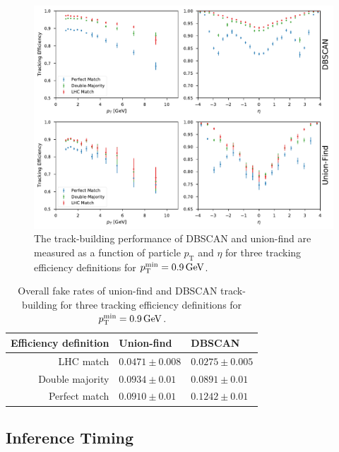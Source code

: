 \documentclass[twocolumn]{svjour3}
\newcommand{\pt}{\ensuremath{p_{\mathrm{T}}}\xspace}
\newcommand{\GeV}{\ensuremath{\,\text{Ge\hspace{-.08em}V}}\xspace}
\begin{document}
\begin{figure}[!htbp]
\centering
\includegraphics[width=2\columnwidth,clip]{tracking_efficiencies.pdf}
\caption{The track-building performance of DBSCAN and union-find are measured as a function of particle $\pt$ and $\eta$ for three tracking efficiency definitions for $\pt^\mathrm{min}=0.9\GeV$. }
\label{fig:tracking-effs}
\end{figure}

\begin{table}[!htbp]
    \centering
    \begin{tabular}{r|ll}
        Efficiency definition & Union-find & DBSCAN\\
        \hline
        LHC match & $0.0471\pm0.008$ & $0.0275\pm0.005$\\
        Double majority & $0.0934\pm0.01$ & $0.0891\pm0.01$\\
        Perfect match & $0.0910\pm0.01$ & $0.1242\pm0.01$\\
    \end{tabular}
    \caption{Overall fake rates of union-find and DBSCAN track-building for three tracking efficiency definitions for $\pt^\mathrm{min}=0.9\GeV$.}
    \label{tab:fake-rate}
\end{table}

\subsection{Inference Timing}
\label{sec:timing}
\end{document}
